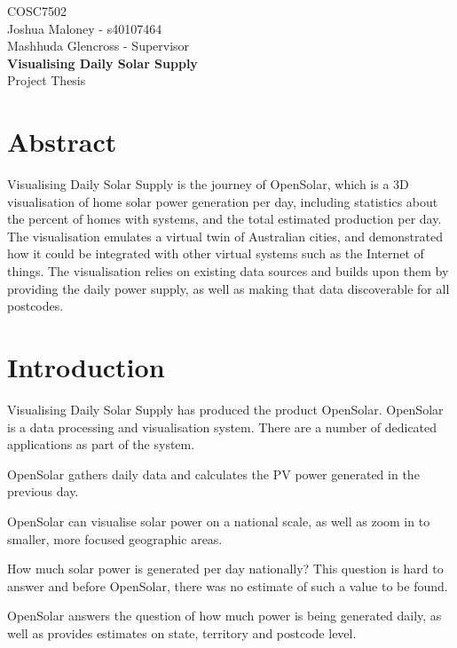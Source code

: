 \documentclass[12pt,a4paper]{report}
\makeatletter
\newcommand*{\toccontents}{\@starttoc{toc}}
\makeatother
\begin{document}
\begin{center}
COSC7502 \\
Joshua Maloney - s40107464 \\
Mashhuda Glencross - Supervisor \\
\Large\textbf{Visualising Daily Solar Supply} \\
Project Thesis \\
\end{center}


\toccontents


\section{Abstract}

Visualising Daily Solar Supply is the journey of OpenSolar, which is a 3D visualisation of home solar power generation per day, including statistics about the percent of homes with systems, and the total estimated production per day. The visualisation emulates a virtual twin of Australian cities, and demonstrated how it could be integrated with other virtual systems such as the Internet of things. The visualisation relies on existing data sources and builds upon them by providing the daily power supply, as well as making that data discoverable for all postcodes.

\section{Introduction}

Visualising Daily Solar Supply has produced the product OpenSolar. OpenSolar is a data processing and visualisation system. There are a number of dedicated applications as part of the system.

OpenSolar gathers daily data and calculates the PV power generated in the previous day.

OpenSolar can visualise solar power on a national scale, as well as zoom in to smaller, more focused geographic areas.


How much solar power is generated per day nationally? This question is hard to answer and before OpenSolar, there was no estimate of such a value to be found.

OpenSolar answers the question of how much power is being generated daily, as well as provides estimates on state, territory and postcode level.
\end{document}
